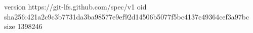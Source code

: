 version https://git-lfs.github.com/spec/v1
oid sha256:421a2c9c3b7731da3ba98577e9ef92d14506b5077f5bc4137c49364cef3a97bc
size 1398246

